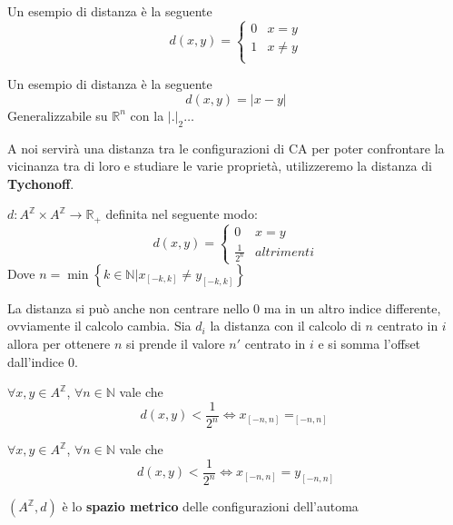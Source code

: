 \begin{esempio}
    Un esempio di distanza è la seguente
    $$d(x,y) =\begin{cases}
            0 & x=y    \\
            1 & x\ne y \\
        \end{cases}$$
\end{esempio}

\begin{esempio}
    Un esempio di distanza è la seguente
    $$d(x,y) =|x-y|$$
    Generalizzabile su $\mathbb{R}^n$ con la $|.|_2$$\dots$
\end{esempio}

A noi servirà una distanza tra le configurazioni di CA per poter confrontare
la vicinanza tra di loro e studiare le varie proprietà, utilizzeremo la distanza di
\textbf{Tychonoff}.
\begin{definizione} 
    $d:A^\mathbb{Z}\times A^\mathbb{Z} \rightarrow \mathbb{R}_+$ definita nel
    seguente modo:
    $$d(x,y) = \begin{cases}
            0             & x=y        \\
            \frac{1}{2^n} & altrimenti
        \end{cases}$$
    Dove $n= \min\left\{k\in \mathbb{N} | x_{[-k,k]} \ne y_{[-k,k]}\right\}$
\end{definizione}

La distanza si può anche non centrare nello $0$ ma in un altro indice differente,
ovviamente il calcolo cambia. Sia $d_i$ la distanza con il calcolo di $n$ centrato
in $i$ allora per ottenere $n$ si prende il valore $n'$ centrato in $i$ e si somma
l'offset dall'indice $0$.

\begin{nota}
    $\forall x,y\in A^\mathbb{Z}$, $\forall n\in \mathbb{N}$ vale che
    $$d(x,y)< \frac{1}{2^n}\iff x_{[-n, n]}=_{[-n, n]}$$
\end{nota}

\begin{nota}  \label{prop:dist}
    $\forall x,y\in A^\mathbb{Z}$, $\forall n\in \mathbb{N}$ vale che
    $$d(x,y)< \frac{1}{2^n}\iff x_{[-n, n]}=y_{[-n, n]}$$
\end{nota}

\begin{definizione}
    $(A^\mathbb{Z}, d)$ è lo \textbf{spazio metrico} delle configurazioni dell'automa
\end{definizione}

